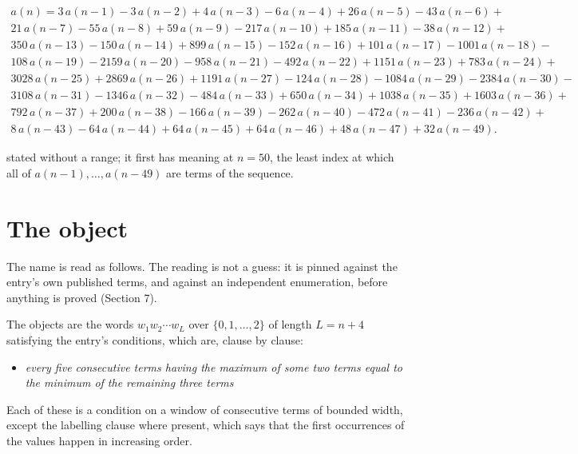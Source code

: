 \documentclass[11pt]{article}
\theoremstyle{definition}
\begin{document}
\begin{multline*} a(n) = 3\,a(n-1) - 3\,a(n-2) + 4\,a(n-3) - 6\,a(n-4) + 26\,a(n-5) - 43\,a(n-6) + \\ 21\,a(n-7) - 55\,a(n-8) + 59\,a(n-9) - 217\,a(n-10) + 185\,a(n-11) - 38\,a(n-12) + \\ 350\,a(n-13) - 150\,a(n-14) + 899\,a(n-15) - 152\,a(n-16) + 101\,a(n-17) - 1001\,a(n-18) - \\ 108\,a(n-19) - 2159\,a(n-20) - 958\,a(n-21) - 492\,a(n-22) + 1151\,a(n-23) + 783\,a(n-24) + \\ 3028\,a(n-25) + 2869\,a(n-26) + 1191\,a(n-27) - 124\,a(n-28) - 1084\,a(n-29) - 2384\,a(n-30) - \\ 3108\,a(n-31) - 1346\,a(n-32) - 484\,a(n-33) + 650\,a(n-34) + 1038\,a(n-35) + 1603\,a(n-36) + \\ 792\,a(n-37) + 200\,a(n-38) - 166\,a(n-39) - 262\,a(n-40) - 472\,a(n-41) - 236\,a(n-42) + \\ 8\,a(n-43) - 64\,a(n-44) + 64\,a(n-45) + 64\,a(n-46) + 48\,a(n-47) + 32\,a(n-49). \end{multline*}

stated without a range; it first has meaning at $n = 50$, the least index at which all of $a(n-1),\dots,a(n-49)$ are terms of the sequence.

\section{The object}

The name is read as follows. The reading is not a guess: it is pinned against the entry's own published terms, and against an independent enumeration, before anything is proved (Section 7).

The objects are the words $w_1 w_2 \cdots w_L$ over $\{0,1,\dots,2\}$ of length $L = n + 4$ satisfying the entry's conditions, which are, clause by clause:

\begin{itemize}

\item {\itshape every five consecutive terms having the maximum of some two terms equal to the minimum of the remaining three terms}

\end{itemize}

Each of these is a condition on a window of consecutive terms of bounded width, except the labelling clause where present, which says that the first occurrences of the values happen in increasing order.
\end{document}
